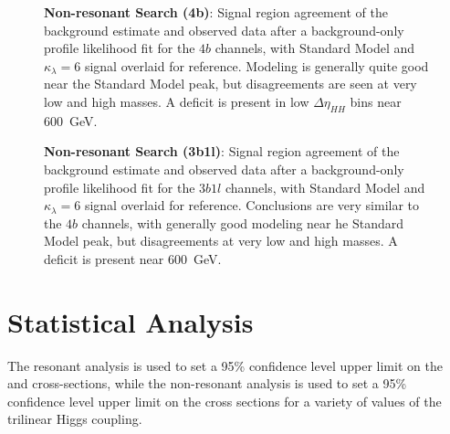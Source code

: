 \begin{figure}[ht]
  \centering
  \hspace*{-2cm}
  \caption{\label{fig:nonres-sr-mhh-4b} \textbf{Non-resonant Search (4b)}: Signal region agreement of the background estimate and observed data after a background-only profile likelihood fit for the $4b$ channels, with Standard Model 
  and $\kappa_{\lambda}=6$ signal overlaid for reference. Modeling is generally quite good near the Standard Model peak, but disagreements are seen at very low and high masses. A deficit is present in low $\Delta\eta_{HH}$ bins near \SI{600}{\GeV}.}
\end{figure}

\begin{figure}[ht]
  \centering
   \hspace*{-2cm}
  \caption{\label{fig:nonres-sr-mhh-3b1l} \textbf{Non-resonant Search (3b1l)}: Signal region agreement of the background estimate and observed data after a background-only profile likelihood fit for the $3b1l$ channels, with Standard Model
  and $\kappa_{\lambda}=6$ signal overlaid for reference. Conclusions are very similar to the $4b$ channels, with generally good modeling near he Standard Model peak, but disagreements at very low and high masses. A deficit is present near \SI{600}{\GeV}.}
\end{figure}

\FloatBarrier
\clearpage
\section{Statistical Analysis}
The resonant analysis is used to set a 95\% confidence level upper limit on the
\HepProcess{\Pp \Pp \to \PScal \to \higgs \higgs \to \Pqb \Paqb \Pqb \Paqb} and
\HepProcess{\Pp \Pp \to \PGrav \to \higgs \higgs \to \Pqb \Paqb \Pqb \Paqb} cross-sections, 
while the non-resonant analysis is used to set a 95\% confidence level upper limit on the
\HepProcess{\Pp \Pp \to \higgs \higgs \to \Pqb \Paqb \Pqb \Paqb} cross sections for a 
variety of values of the trilinear Higgs coupling.

